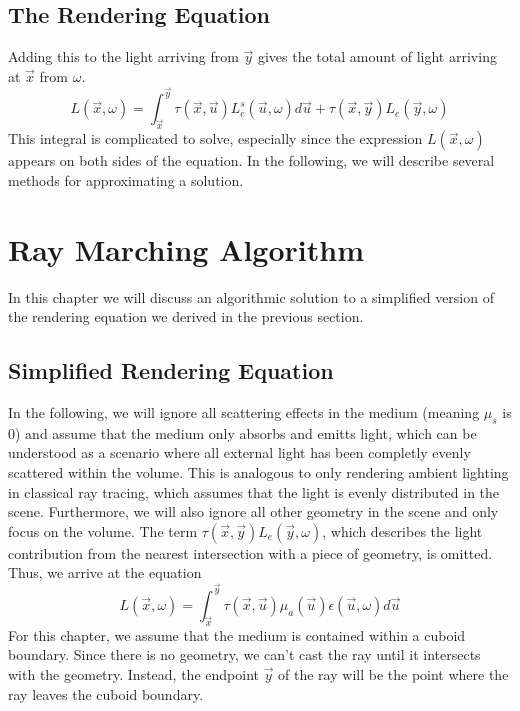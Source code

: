 \subsection{The Rendering Equation}
Adding this to the light arriving from $\vec{y}$ gives the total amount of light arriving at $\vec{x}$ from $\omega $.
\begin{equation}
L(\vec{x}, \omega ) = {\int_{\vec{x}}^{\vec{y}} \tau(\vec{x}, \vec{u})L_e^s(\vec{u}, \omega )d\vec{u}} + \tau(\vec{x}, \vec{y}) L_e(\vec{y}, \omega )
\end{equation}
This integral is complicated to solve, especially since the expression $L(\vec{x}, \omega )$ appears on both sides of the equation.
In the following, we will describe several methods for approximating a solution.




\section{Ray Marching Algorithm}
In this chapter we will discuss an algorithmic solution\cite{511, 10.1145/147130.147155} to a simplified version of the rendering equation we derived in the previous section.
\subsection{Simplified Rendering Equation}
In the following, we will ignore all scattering effects in the medium (meaning $\mu_s $ is 0) and assume that the medium only absorbs and emitts light\cite{10.1145/147130.147155}, which can be understood as a scenario where all external light has been completly evenly scattered within the volume. This is analogous to only rendering ambient lighting in classical ray tracing, which assumes that the light is evenly distributed in the scene.
Furthermore, we will also ignore all other geometry in the scene and only focus on the volume. The term $\tau(\vec{x}, \vec{y}) L_e(\vec{y}, \omega )$, which describes the light contribution from the nearest intersection with a piece of geometry, is omitted.
Thus, we arrive at the equation
\begin{equation} \label{eq:simplified_req}
L(\vec{x}, \omega ) = \int_{\vec{x}}^{\vec{y}} \tau(\vec{x}, \vec{u}){\mu}_a(\vec{u})\epsilon (\vec{u}, \omega)d\vec{u}
\end{equation}
For this chapter, we assume that the medium is contained within a cuboid boundary\cite{10.1145/147130.147155, 10.1145/78964.78965}. Since there is no geometry, we can't cast the ray until it intersects with the geometry. Instead, the endpoint $\vec{y}$ of the ray will be the point where the ray leaves the cuboid boundary.

